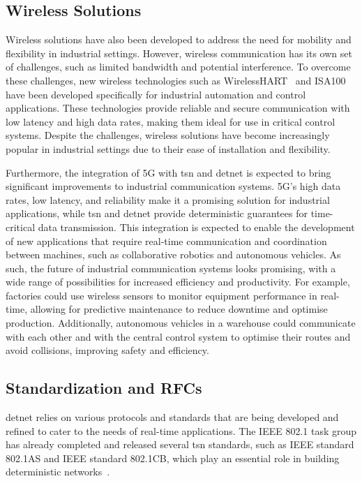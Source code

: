 \documentclass[runningheads]{llncs}
\begin{document}
\subsection*{Wireless Solutions}
Wireless solutions have also been developed to address the need for mobility and flexibility in industrial settings. However, wireless communication has its own set of challenges, such as limited bandwidth and potential interference. To overcome these challenges, new wireless technologies such as WirelessHART~\cite{Song2008} and ISA100~\cite{Adriano2018} have been developed specifically for industrial automation and control applications. These technologies provide reliable and secure communication with low latency and high data rates, making them ideal for use in critical control systems. Despite the challenges, wireless solutions have become increasingly popular in industrial settings due to their ease of installation and flexibility.

Furthermore, the integration of 5G with \gls{tsn} and \gls{detnet} is expected to bring significant improvements to industrial communication systems. 5G's high data rates, low latency, and reliability make it a promising solution for industrial applications, while \gls{tsn} and \gls{detnet} provide deterministic guarantees for time-critical data transmission. This integration is expected to enable the development of new applications that require real-time communication and coordination between machines, such as collaborative robotics and autonomous vehicles. As such, the future of industrial communication systems looks promising, with a wide range of possibilities for increased efficiency and productivity. For example, factories could use wireless sensors to monitor equipment performance in real-time, allowing for predictive maintenance to reduce downtime and optimise production. Additionally, autonomous vehicles in a warehouse could communicate with each other and with the central control system to optimise their routes and avoid collisions, improving safety and efficiency.~\cite{Atiq2022}

\subsection*{Standardization and RFCs}
\gls{detnet} relies on various protocols and standards that are being developed and refined to cater to the needs of real-time applications. The IEEE 802.1 task group has already completed and released several \gls{tsn} standards, such as IEEE standard 802.1AS and IEEE standard 802.1CB, which play an essential role in building deterministic networks~\cite{Finn2018}.
\end{document}

